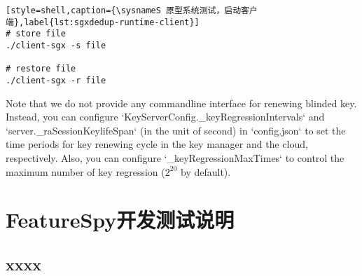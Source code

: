 \begin{lstlisting}[style=shell,caption={\sysnameS 原型系统测试，启动客户端},label{lst:sgxdedup-runtime-client}]
# store file
./client-sgx -s file

# restore file
./client-sgx -r file
\end{lstlisting}

Note that we do not provide any commandline interface for renewing blinded key. Instead, you can configure `KeyServerConfig.\_keyRegressionIntervals` and `server.\_raSessionKeylifeSpan` (in the unit of second) in `config.json` to set the time periods for key renewing cycle in the key manager and the cloud, respectively. Also, you can configure `\_keyRegressionMaxTimes` to control the maximum number of key regression ($2^20$ by default).

\chapter{FeatureSpy开发测试说明}
\section{xxxx}